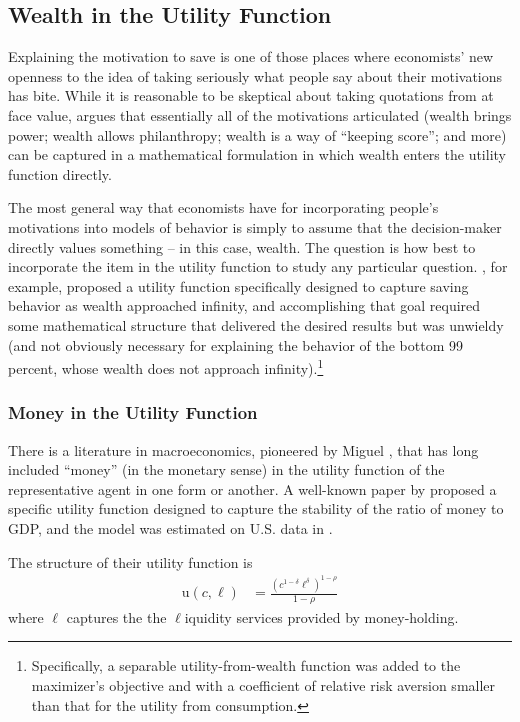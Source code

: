 \documentclass{article}
\newcommand{\CRRA}{\rho}
\newcommand{\uFunc}{\mathrm{u}}
\newcommand{\cNrm}{c}
\newcommand{\lqdt}{\ell}
\begin{document}
\bigskip\subsection{Wealth in the Utility Function}

Explaining the motivation to save is one of those places where economists' new openness to the idea of taking seriously what people say about their motivations has bite.
While it is reasonable to be skeptical about taking quotations from \cite{jaherGilded} at face value, \cite{WhyDoTheRich} argues that essentially all of the motivations articulated (wealth brings power; wealth allows philanthropy; wealth is a way of ``keeping score''; and more) can be captured in a mathematical formulation in which wealth enters the utility function directly.

The most general way that economists have for incorporating people's motivations into models of behavior is simply to assume that the decision-maker directly values something -- in this case, wealth.
The question is how best to incorporate the item in the utility function to study any particular question.
\cite{WhyDoTheRich}, for example, proposed a utility function specifically designed to capture saving behavior as wealth approached infinity, and accomplishing that goal required some mathematical structure that delivered the desired results but was unwieldy (and not obviously necessary for explaining the behavior of the bottom 99 percent, whose wealth does not approach infinity).\footnote{Specifically, a separable utility-from-wealth function was added to the maximizer's objective and with a coefficient of relative risk aversion smaller than that for the utility from consumption.}

\subsubsection{Money in the Utility Function}

There is a literature in macroeconomics, pioneered by Miguel \cite{sidrauski1967rational}, that has long included ``money'' (in the monetary sense) in the utility function of the representative agent in one form or another.
A well-known paper by \cite{Rotemberg1984} proposed a specific utility function designed to capture the stability of the ratio of money to GDP, and the model was estimated on U.S. data in \cite{Poterba_1986}.

The structure of their utility function is
\begin{align}
    \uFunc(\cNrm,\lqdt) & = \frac{\left(
        \cNrm^{1-\delta}\lqdt^{\delta}
        \right)^{1-\CRRA}}{1-\CRRA}
\end{align}
where $\lqdt$ captures the the $\lqdt$iquidity services provided by money-holding.
\end{document}
